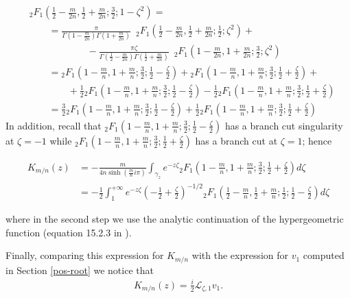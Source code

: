 \documentclass{article}
\theoremstyle{definition}
\newcommand{\laplace}{\mathcal{L}}
\begin{document}
\begin{align*}
    &{}_2F_1\left(\frac{1}{2}-\frac{m}{2n},\frac{1}{2}+\frac{m}{2n};\frac{3}{2};1-\zeta^2\right)=\\
    &\qquad = \frac{\pi}{\Gamma\left(1-\frac{m}{2n}\right)\Gamma\left(1+\frac{m}{2n}\right)} \,\,\, {}_2F_1\left(\frac{1}{2}-\frac{m}{2n},\frac{1}{2}+\frac{m}{2n};\frac{1}{2};\zeta^2\right)+\\
    &\qquad \qquad\qquad - \frac{\pi \zeta}{\Gamma\left(\frac{1}{2}-\frac{m}{2n}\right)\Gamma\left(\frac{1}{2}+\frac{m}{2n}\right)} \,\,\, {}_2F_1\left(1-\frac{m}{2n},1+\frac{m}{2n};\frac{3}{2};\zeta^2\right)\\
    &\qquad ={}_2F_1\left(1-\frac{m}{n},1+\frac{m}{n};\frac{3}{2};\frac{1}{2}-\frac{\zeta}{2}\right)+{}_2F_1\left(1-\frac{m}{n},1+\frac{m}{n};\frac{3}{2};\frac{1}{2}+\frac{\zeta}{2}\right)+\\
    &\qquad\qquad +\frac{1}{2} {}_2F_1\left(1-\frac{m}{n},1+\frac{m}{n};\frac{3}{2};\frac{1}{2}-\frac{\zeta}{2}\right)-\frac{1}{2}{}_2F_1\left(1-\frac{m}{n},1+\frac{m}{n};\frac{3}{2};\frac{1}{2}+\frac{\zeta}{2}\right)\\
    &\qquad =\frac{3}{2} {}_2F_1\left(1-\frac{m}{n},1+\frac{m}{n};\frac{3}{2};\frac{1}{2}-\frac{\zeta}{2}\right)+\frac{1}{2}{}_2F_1\left(1-\frac{m}{n},1+\frac{m}{n};\frac{3}{2};\frac{1}{2}+\frac{\zeta}{2}\right)
\end{align*}
In addition, recall that ${}_2F_1\left(1-\frac{m}{n},1+\frac{m}{n};\frac{3}{2};\frac{1}{2}-\frac{\zeta}{2}\right)$ has a branch cut singularity at $\zeta=-1$ while ${}_2F_1\left(1-\frac{m}{n},1+\frac{m}{n};\frac{3}{2};\frac{1}{2}+\frac{\zeta}{2}\right)$ has a branch cut at $\zeta=1$; hence 

\begin{align*}
    K_{m/n}(z)&=-\frac{m}{4 n\sinh(\tfrac{m}{n}i\pi)}\int_{\gamma_z}e^{-z\zeta} {}_2F_1\left(1-\frac{m}{n},1+\frac{m}{n};\frac{3}{2};\frac{1}{2}+\frac{\zeta}{2}\right) d\zeta\\
    &=-\frac{1}{2}\int_{1}^{+\infty}e^{-z\zeta} \left(-\frac{1}{2}+\frac{\zeta}{2}\right)^{-1/2} {}_2F_1\left(\frac{1}{2}-\frac{m}{n},\frac{1}{2}+\frac{m}{n};\frac{1}{2};\frac{1}{2}-\frac{\zeta}{2}\right) d\zeta
\end{align*}

where in the second step we use the analytic continuation of the hypergeometric function (equation 15.2.3 in \cite{dlmf}). 

Finally, comparing this expression for $K_{m/n}$ with the expression for $v_1$ computed in Section \ref{pos-root} we notice that 
\begin{align*}
    K_{m/n}(z)=\frac{i}{2}\laplace_{\zeta,1}v_1 .
\end{align*}
\end{document}
